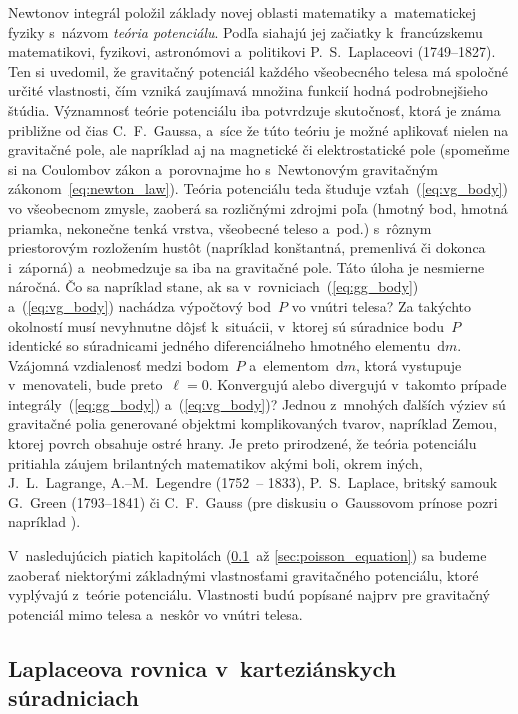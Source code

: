 \documentclass[a4paper, 12pt]{book}
\newcommand{\diff}{\mathrm d}
\begin{document}
Newtonov integrál položil základy novej oblasti matematiky a~matematickej 
fyziky s~názvom \emph{teória potenciálu}.  Podľa \textcite{MacMillan1930} 
siahajú jej začiatky k~francúzskemu matematikovi, fyzikovi, astronómovi 
a~politikovi P.~S.~Laplaceovi (1749--1827).  Ten si uvedomil, že gravitačný 
potenciál každého všeobecného telesa má spoločné určité vlastnosti, čím vzniká 
zaujímavá množina funkcií hodná podrobnejšieho štúdia.  Významnosť teórie 
potenciálu iba potvrdzuje skutočnosť, ktorá je známa približne od čias 
C.~F.~Gaussa, a~síce že túto teóriu je možné aplikovať nielen na gravitačné 
pole, ale napríklad aj na magnetické či elektrostatické pole (spomeňme si na 
Coulombov zákon a~porovnajme ho s~Newtonovým gravitačným 
zákonom~\ref{eq:newton_law}).  Teória potenciálu teda študuje 
vzťah~(\ref{eq:vg_body}) vo všeobecnom zmysle, zaoberá sa rozličnými zdrojmi 
poľa (hmotný bod, hmotná priamka, nekonečne tenká vrstva, všeobecné teleso 
a~pod.) s~rôznym priestorovým rozložením hustôt (napríklad konštantná, 
premenlivá či dokonca i~záporná) a~neobmedzuje sa iba na gravitačné pole.  Táto 
úloha je nesmierne náročná.  Čo sa napríklad stane, ak sa 
v~rovniciach~(\ref{eq:gg_body}) a~(\ref{eq:vg_body}) nachádza výpočtový bod~$P$ 
vo vnútri telesa?  Za takýchto okolností musí nevyhnutne dôjsť k~situácii, 
v~ktorej sú súradnice bodu~$P$ identické so súradnicami jedného diferenciálneho 
hmotného elementu~$\diff m$.  Vzájomná vzdialenosť medzi bodom~$P$ 
a~elementom~$\diff m$, ktorá vystupuje v~menovateli, bude preto~$\ell = 0$.  
Konvergujú alebo divergujú v~takomto prípade integrály~(\ref{eq:gg_body}) 
a~(\ref{eq:vg_body})?  Jednou z~mnohých ďalších výziev sú gravitačné polia 
generované objektmi komplikovaných tvarov, napríklad Zemou, ktorej povrch 
obsahuje ostré hrany.  Je preto prirodzené, že teória potenciálu pritiahla 
záujem brilantných matematikov akými boli, okrem iných, J.~L.~Lagrange, 
A.--M.~Legendre (1752~-- 1833), P.~S.~Laplace, britský samouk G.~Green 
(1793--1841) či C.~F.~Gauss (pre diskusiu o~Gaussovom prínose pozri napríklad 
\cite{Freeden2018}).

V~nasledujúcich piatich kapitolách (\ref{sec:laplace_equation_cart}~až 
\ref{sec:poisson_equation}) sa budeme zaoberať niektorými základnými
vlastnosťami gravitačného potenciálu, ktoré vyplývajú z~teórie potenciálu.
Vlastnosti budú popísané najprv pre gravitačný potenciál mimo telesa a~neskôr 
vo vnútri telesa.





\subsection{Laplaceova rovnica v~karteziánskych súradniciach}
\label{sec:laplace_equation_cart}
\end{document}
